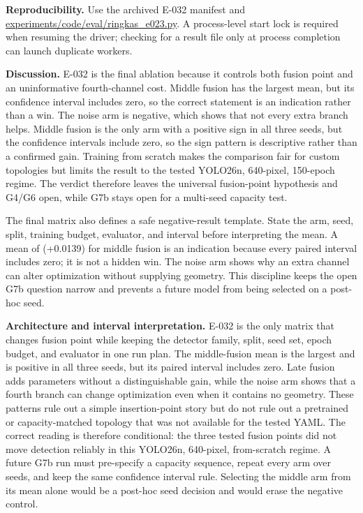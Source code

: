 \documentclass[preprint,12pt]{elsarticle}
\newcommand{\pathcode}[1]{\scriptsize\url{#1}}
\begin{document}
\textbf{Reproducibility.} Use the archived E-032 manifest and
\pathcode{experiments/code/eval/ringkas_e023.py}. A process-level start lock is required when
resuming the driver; checking for a result file only at process completion can
launch duplicate workers.

\textbf{Discussion.} E-032 is the final ablation because it controls both
fusion point and an uninformative fourth-channel cost. Middle fusion has the
largest mean, but its confidence interval includes zero, so the correct
statement is an indication rather than a win. The noise arm is negative,
which shows that not every extra branch helps. Middle fusion is the only arm
with a positive sign in all three seeds, but the confidence intervals include
zero, so the sign pattern is descriptive rather than a confirmed gain.
Training from scratch makes the comparison fair for custom topologies but
limits the result to the tested YOLO26n, 640-pixel, 150-epoch regime. The
verdict therefore leaves the universal fusion-point hypothesis and G4/G6
open, while G7b stays open for a multi-seed capacity test.

The final matrix also defines a safe negative-result template. State the arm,
seed, split, training budget, evaluator, and interval before interpreting the
mean. A mean of (+0.0139) for middle fusion is an indication because every
paired interval includes zero; it is not a hidden win. The noise arm shows why
an extra channel can alter optimization without supplying geometry. This
discipline keeps the open G7b question narrow and prevents a future model from
being selected on a post-hoc seed.

\textbf{Architecture and interval interpretation.} E-032 is the only matrix
that changes fusion point while keeping the detector family, split, seed set,
epoch budget, and evaluator in one run plan. The middle-fusion mean is the
largest and is positive in all three seeds, but its paired interval includes
zero. Late fusion adds parameters without a distinguishable gain, while
the noise arm shows that a fourth branch can change optimization even when it
contains no geometry. These patterns rule out a simple insertion-point story
but do not rule out a pretrained or capacity-matched topology that was not
available for the tested YAML. The correct reading is therefore conditional:
the three tested fusion points did not move detection reliably in this
YOLO26n, 640-pixel, from-scratch regime. A future G7b run must pre-specify a
capacity sequence, repeat every arm over seeds, and keep the same confidence
interval rule. Selecting the middle arm from its mean alone would be a
post-hoc seed decision and would erase the negative control.
\end{document}
